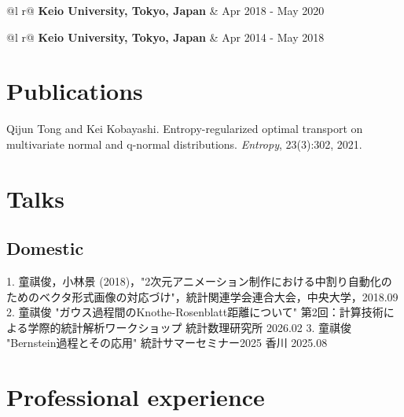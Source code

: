 \documentclass[a4paper,12pt]{article}
\begin{document}
\begin{tabularx}{\linewidth}{ @{}l r@{} }
\textbf{Keio University, Tokyo, Japan} & \hfill Apr 2018 - May 2020 \\[3.75pt]
\end{tabularx}
\begin{tabularx}{\linewidth}{ @{}l r@{} }
\textbf{Keio University, Tokyo, Japan} & \hfill Apr 2014 - May 2018 \\[3.75pt]
\end{tabularx}

\section{Publications}

Qijun Tong and Kei Kobayashi. Entropy-regularized optimal transport on multivariate normal and
q-normal distributions. \textit{Entropy}, 23(3):302, 2021.


\section{Talks}
\subsection*{Domestic}
1. 童祺俊，小林景 (2018)，"2次元アニメーション制作における中割り自動化のためのベクタ形式画像の対応づけ"，統計関連学会連合大会，中央大学，2018.09
2. 童祺俊 "ガウス過程間のKnothe-Rosenblatt距離について" 第2回：計算技術による学際的統計解析ワークショップ 統計数理研究所 2026.02
3. 童祺俊 "Bernstein過程とその応用" 統計サマーセミナー2025 香川 2025.08

\section{Professional experience}
\end{document}
